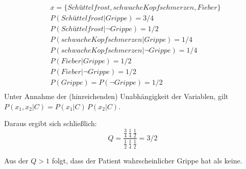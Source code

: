 \begin{align*}
& x = \{Schüttelfrost, schwache Kopfschmerzen, Fieber\} \\
& P(Schüttelfrost|Grippe) = 3/4 \\
& P(Schüttelfrost|\neg Grippe) = 1/2 \\
& P(schwache Kopfschmerzen|Grippe) = 1/4 \\
& P(schwache Kopfschmerzen|\neg Grippe) = 1/4 \\
& P(Fieber|Grippe) = 1/2 \\
& P(Fieber|\neg Grippe) = 1/2 \\
& P(Grippe) = P(\neg Grippe) = 1/2 \\
\end{align*}
Unter Annahme der (hinreichenden) Unabhängigkeit der Variablen, gilt $P(x_1, x_2 |C) = P(x_1|C)\, P(x_2|C)$.

Daraus ergibt sich schließlich:
\begin{equation*}
Q = \frac{\frac{3}{4} \, \frac{1}{4}\, \frac{1}{2}}{\frac{1}{2} \, \frac{1}{4}\, \frac{1}{2}} = 3/2
\end{equation*}

Aus der $Q > 1$ folgt, dass der Patient wahrscheinlicher Grippe hat als keine.

